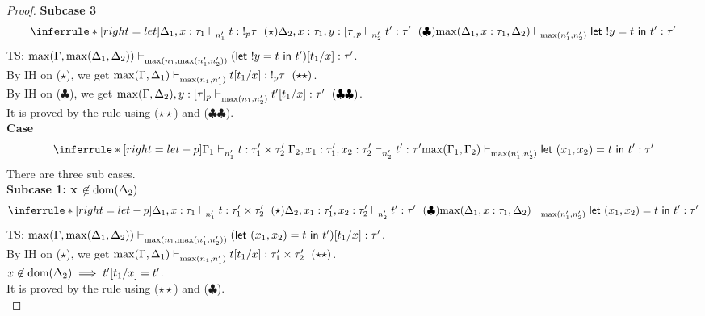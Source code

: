 \documentclass{article}
\begin{document}
\begin{proof}
\textbf{Subcase 3 }
\[
   \inferrule*[ right = let ]
   {\Delta_1, x:\tau_1 \jtype{n_1'}{}{t}{!_p \tau}~(\star) \\ \Delta_2, x: \tau_1, y: [\tau]_p \jtype{n_2'}{}{t'}{\tau'}~(\clubsuit)}
   {  \max(\Delta_1, x: \tau_1, \Delta_2) \jtype{\max(n_1',n_2')}{}{\letx{!y}{t}{t'}}{\tau'}  }
\]
TS: $ \max(\Gamma, \max(\Delta_1,\Delta_2) ) \mathrel{\vdash_{\max(n_1,\max(n_1',n_2') )}^{} {  (\mathrel{ \mathsf{let}\ {!y} = {t} \ \mathsf{in} \ {t'} })[t_1/x] } : {\tau'}}  $. \\
By IH on ($\star$), we get $\max(\Gamma, \Delta_1) \jtype{\max(n_1,n_1') }{}{t[t_1/x]}{!_p \tau}~(\star\star) $. \\
By IH on ($\clubsuit$), we get $\max(\Gamma, \Delta_2),y:[\tau]_p \mathrel{\vdash_{\max(n_1,n_2') }^{} {t'[t_1/x]} : {\tau'}}~(\clubsuit\clubsuit) $. \\
It is proved by the rule  using ($\star\star$) and ($\clubsuit\clubsuit$).\\

\noindent \textbf{Case} 
\[
   \inferrule*[ right = let-p ]
   {\Gamma_1 \jtype{n_1'}{}{t}{\tau_1' \times \tau_2' } \\ \Gamma_2, x_1: \tau_1', x_2 : \tau_2' \jtype{n_2'}{}{t'}{\tau'}}
   { \max(\Gamma_1, \Gamma_2)  \jtype{\max(n_1',n_2')}{}{ \letx{(x_1,x_2)}{t}{t'} }{\tau'}  }
\]
There are three sub cases.\\
\textbf{Subcase 1: x $\not \in \text{dom}(\Delta_2)$ }
\[
   \inferrule*[ right = let-p ]
   {\Delta_1, x: \tau_1 \jtype{n_1'}{}{t}{\tau_1' \times \tau_2'}~(\star) \\ \Delta_2, x_1:\tau_1', x_2: \tau_2' \jtype{n_2'}{}{t'}{\tau'}~(\clubsuit)}
   {  \max(\Delta_1, x: \tau_1, \Delta_2) \jtype{\max(n_1',n_2')}{}{\letx{(x_1,x_2)}{t}{t'}}{\tau'}  }
\]
 TS: $ \max(\Gamma, \max(\Delta_1,\Delta_2) ) \mathrel{\vdash_{\max(n_1,\max(n_1',n_2') )}^{} {  (\mathrel{ \mathsf{let}\ {(x_1,x_2)} = {t} \ \mathsf{in} \ {t'} })[t_1/x] } : {\tau'}}  $. \\
 By IH on ($\star$), we get $\max(\Gamma, \Delta_1) \jtype{\max(n_1,n_1') }{}{t[t_1/x]}{\tau_1' \times \tau_2'}~(\star\star) $. \\
 $x \not \in \text{dom}(\Delta_2) \implies t'[t_1/x] =  t'$.\\
 It is proved by the rule  using ($\star\star$) and ($\clubsuit$). \\


\end{proof}
\end{document}
